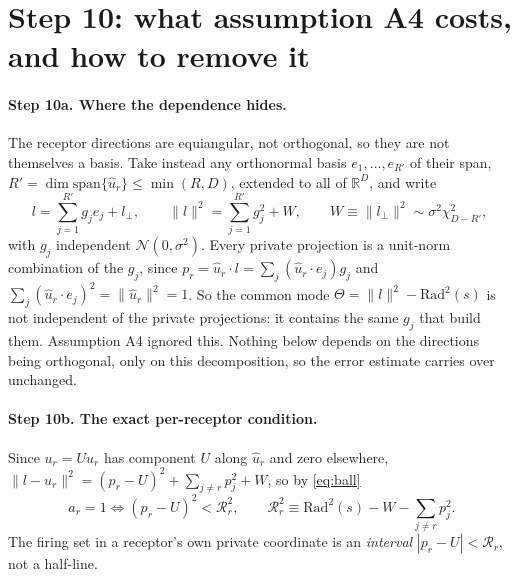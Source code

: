 \documentclass[11pt,a4paper]{article}
\newcommand{\RR}{\mathbb{R}}
\newcommand{\uhat}{\hat{u}}
\begin{document}
\section{Step 10: what assumption A4 costs, and how to remove it}
\label{sec:exact}

\paragraph{Step 10a. Where the dependence hides.} The receptor directions are equiangular,
not orthogonal, so they are not themselves a basis. Take instead any orthonormal basis
$e_1,\dots,e_{R'}$ of their span, $R'=\dim\mathrm{span}\{\uhat_r\}\le\min(R,D)$, extended
to all of $\RR^D$, and write
\begin{equation}
  l=\sum_{j=1}^{R'} g_j e_j+l_\perp,
  \qquad
  \|l\|^2=\sum_{j=1}^{R'} g_j^2+W,
  \qquad
  W\equiv\|l_\perp\|^2\sim\sigma^2\chi^2_{D-R'},
\end{equation}
with $g_j$ independent $\mathcal{N}(0,\sigma^2)$. Every private projection is a unit-norm
combination of the $g_j$, since $p_r=\uhat_r\cdot l=\sum_j(\uhat_r\cdot e_j)g_j$ and
$\sum_j(\uhat_r\cdot e_j)^2=\|\uhat_r\|^2=1$. So the common mode
$\Theta=\|l\|^2-\mathrm{Rad}^2(s)$ is not independent of the private projections: it
contains the same $g_j$ that build them. Assumption A4 ignored this. Nothing below depends
on the directions being orthogonal, only on this decomposition, so the error estimate
carries over unchanged.

\paragraph{Step 10b. The exact per-receptor condition.} Since $u_r=U\uhat_r$ has
component $U$ along $\uhat_r$ and zero elsewhere,
$\|l-u_r\|^2=(p_r-U)^2+\sum_{j\neq r}p_j^2+W$, so by \eqref{eq:ball}
\begin{equation}
  \boxed{\;a_r=1 \iff (p_r-U)^2<\mathcal{R}_r^2,
  \qquad
  \mathcal{R}_r^2\equiv \mathrm{Rad}^2(s)-W-\sum_{j\neq r}p_j^2 . }
  \label{eq:exactcond}
\end{equation}
The firing set in a receptor's own private coordinate is an \emph{interval}
$|p_r-U|<\mathcal{R}_r$, not a half-line.
\end{document}
